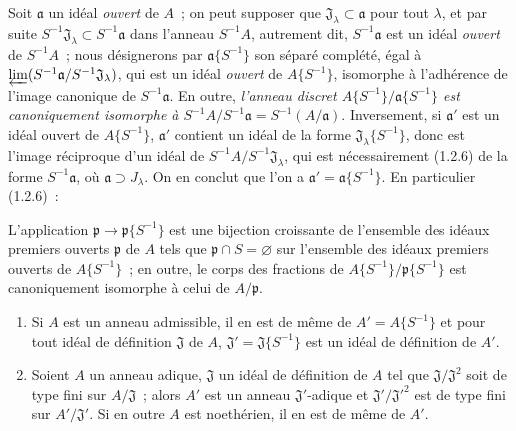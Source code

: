 \begin{env}[7.6.9]
\label{0.7.6.9-fr}
Soit $\mathfrak a$ un idéal \emph{ouvert} de $A$~; on peut supposer que
$\mathfrak J_\lambda\subset\mathfrak a$ pour tout $\lambda$, et par suite
$S^{-1}\mathfrak J_\lambda\subset S^{-1}\mathfrak a$ dans l'anneau
$S^{-1}A$, autrement dit, $S^{-1}\mathfrak a$ est un idéal \emph{ouvert} de
$S^{-1}A$~; nous désignerons par $\mathfrak a\{S^{-1}\}$ son séparé complété,
égal à $\varprojlim(S^{-1}\mathfrak a/S^{-1}\mathfrak J_\lambda)$, qui est un
idéal \emph{ouvert} de $A\{S^{-1}\}$, isomorphe à l'adhérence de l'image
canonique de $S^{-1}\mathfrak a$. En outre, \emph{l'anneau discret
$A\{S^{-1}\}/\mathfrak a\{S^{-1}\}$ est canoniquement isomorphe à
$S^{-1}A/S^{-1}\mathfrak a=S^{-1}(A/\mathfrak a)$}. Inversement, si
$\mathfrak a'$ est un idéal ouvert de $A\{S^{-1}\}$, $\mathfrak a'$ contient
un idéal de la forme $\mathfrak J_\lambda\{S^{-1}\}$, donc est l'image
réciproque d'un idéal de $S^{-1}A/S^{-1}\mathfrak J_\lambda$, qui est
nécessairement (1.2.6) de la forme $S^{-1}\mathfrak a$, où
$\mathfrak a\supset J_\lambda$. On en conclut que l'on a
$\mathfrak a'=\mathfrak a\{S^{-1}\}$. En particulier (1.2.6)~:
\end{env}

\begin{proposition}[7.6.10]
\label{0.7.6.10-fr}
L'application $\mathfrak p\to\mathfrak p\{S^{-1}\}$ est une bijection
croissante de l'ensemble des idéaux \textup{premiers ouverts} $\mathfrak p$ de $A$ tels
que $\mathfrak p\cap S=\varnothing$ sur l'ensemble des idéaux \textup{premiers ouverts}
de $A\{S^{-1}\}$~; en outre, le corps des fractions de
$A\{S^{-1}\}/\mathfrak p\{S^{-1}\}$ est canoniquement isomorphe à celui de
$A/\mathfrak p$.
\end{proposition}

\begin{proposition}[7.6.11]
\label{0.7.6.11-fr}
\begin{enumerate}
  \item[\rm(i)] Si $A$ est un anneau admissible, il en est de même de
    $A'=A\{S^{-1}\}$ et pour tout idéal de définition $\mathfrak J$ de $A$,
    $\mathfrak J'=\mathfrak J\{S^{-1}\}$ est un idéal de définition de $A'$.
  \item[\rm(ii)] Soient $A$ un anneau adique, $\mathfrak J$ un idéal de
    définition de $A$ tel que $\mathfrak J/\mathfrak J^2$ soit de type fini
    sur $A/\mathfrak J$~; alors $A'$ est un anneau $\mathfrak J'$-adique et
    $\mathfrak J'/\mathfrak J'^2$ est de type fini sur
    $A'/\mathfrak J'$. Si en outre $A$ est noethérien, il en est de même de
    $A'$.
\end{enumerate}
\end{proposition}

